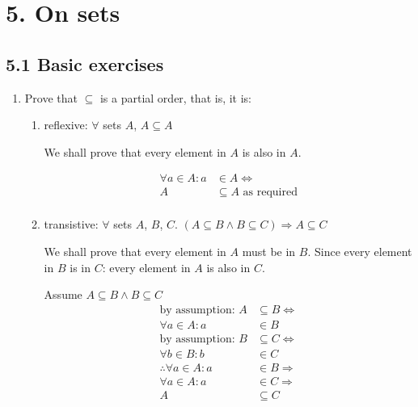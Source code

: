 \documentclass[10pt,\jkfside,a4paper]{article}
\begin{document}
\section*{5. On sets}

\subsection*{5.1 Basic exercises}

\begin{enumerate}

\item Prove that $\subseteq$ is a partial order, that is, it is:

\begin{enumerate}

\item reflexive: $\forall$ sets $A$, $A \subseteq A$

We shall prove that every element in $A$ is also in $A$.

\begin{equation}
\begin{split}
\forall a \in A: a &\in A \Longleftrightarrow\\
A &\subseteq A \text{ as required}\\
\end{split}
\end{equation}

\item transistive: $\forall$ sets $A$, $B$, $C$. $(A \subseteq B \wedge B \subseteq C) \Longrightarrow A \subseteq C$

We shall prove that every element in $A$ must be in $B$. Since every element in $B$ is in $C$: every element in $A$ is also in $C$.

Assume $A \subseteq B \wedge B \subseteq C$
\begin{equation}
\begin{split}
\text{by assumption: } A &\subseteq B \Longleftrightarrow\\
\forall a \in A: a &\in B\\
\text{by assumption: } B &\subseteq C \Longleftrightarrow\\
\forall b \in B: b &\in C\\
\therefore \forall a \in A: a &\in B \Longrightarrow\\
\forall a \in A: a &\in C \Longrightarrow\\
A &\subseteq C\\
\end{split}
\end{equation}


\end{enumerate}
\end{enumerate}
\end{document}

